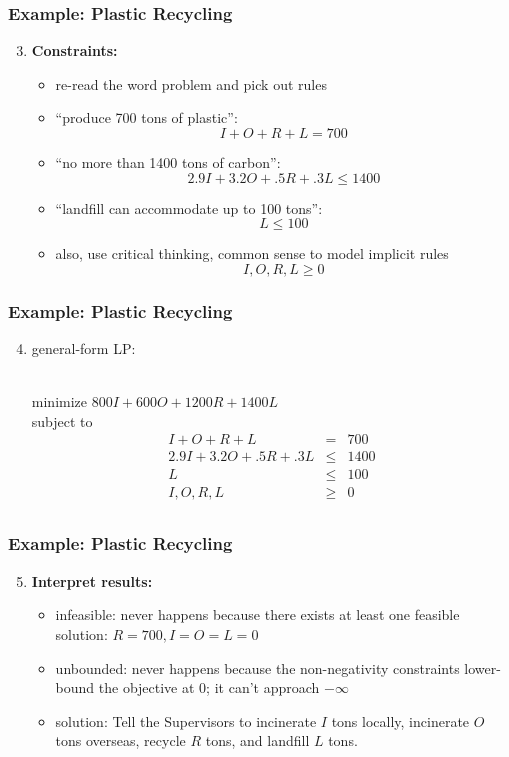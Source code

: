 \documentclass{beamer}
\newcommand{\stanza}{ \\~\ }
\begin{document}
\begin{frame} \frametitle{Example: Plastic Recycling}
\begin{enumerate}
  \setcounter{enumi}{2}
  \item \textbf{Constraints:}
  \begin{itemize}
    \item re-read the word problem and pick out rules
    \item ``produce 700 tons of plastic'': \[I+O+R+L=700\]
    \item ``no more than 1400 tons of carbon'': \[2.9I + 3.2O + .5R + .3L \leq 1400\]
    \item ``landfill can accommodate up to 100 tons'': \[L \leq 100\]
    \item also, use critical thinking, common sense to model implicit rules
    \[ I, O, R, L \geq 0 \]
  \end{itemize}
\end{enumerate}
\end{frame}

\begin{frame} \frametitle{Example: Plastic Recycling}
  \begin{enumerate}
    \setcounter{enumi}{3}
\item general-form LP: \stanza

minimize $800I + 600O + 1200R + 1400L$ \\
subject to
\begin{eqnarray*}
  I+O+R+L &=& 700 \\
  2.9I + 3.2O + .5R + .3L &\leq& 1400 \\
  L &\leq& 100 \\
  I, O, R, L &\geq& 0 \\
\end{eqnarray*}
\end{enumerate}
\end{frame}

\begin{frame} \frametitle{Example: Plastic Recycling}
\begin{enumerate}
  \setcounter{enumi}{4}
  \item \textbf{Interpret results:}
  \begin{itemize}
    \item infeasible: never happens because there exists at least one feasible
      solution: $R=700, I=O=L=0$
    \item unbounded: never happens because the
      non-negativity constraints lower-bound the objective at 0; it can't
      approach $-\infty$
    \item solution: Tell the Supervisors to incinerate $I$ tons locally,
    incinerate $O$ tons overseas, recycle $R$ tons, and landfill $L$ tons.
  \end{itemize}
\end{enumerate}
\end{frame}
\end{document}
